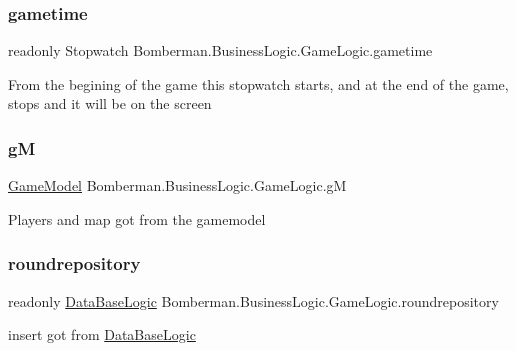 \subsubsection{\texorpdfstring{gametime}{gametime}}
{\footnotesize\ttfamily readonly Stopwatch Bomberman.\+Business\+Logic.\+Game\+Logic.\+gametime\hspace{0.3cm}{\ttfamily [private]}}



From the begining of the game this stopwatch starts, and at the end of the game, stops and it will be on the screen 

\mbox{\label{class_bomberman_1_1_business_logic_1_1_game_logic_abde3e754422fcaffa997b571fb9e7010}} 
\subsubsection{\texorpdfstring{gM}{gM}}
{\footnotesize\ttfamily \mbox{\hyperlink{class_bomberman_1_1_business_logic_1_1_game_model}{Game\+Model}} Bomberman.\+Business\+Logic.\+Game\+Logic.\+gM}



Players and map got from the gamemodel 

\mbox{\label{class_bomberman_1_1_business_logic_1_1_game_logic_a95da6fac5895dd6800d792cbb90e48eb}} 
\subsubsection{\texorpdfstring{roundrepository}{roundrepository}}
{\footnotesize\ttfamily readonly \mbox{\hyperlink{class_bomberman_1_1_business_logic_1_1_data_base_logic}{Data\+Base\+Logic}} Bomberman.\+Business\+Logic.\+Game\+Logic.\+roundrepository\hspace{0.3cm}{\ttfamily [private]}}



insert got from \mbox{\hyperlink{class_bomberman_1_1_business_logic_1_1_data_base_logic}{Data\+Base\+Logic}} 

